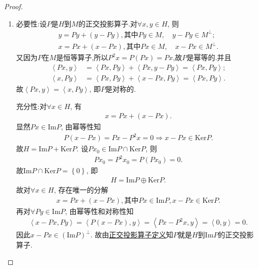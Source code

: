 \documentclass[../../main.tex]{subfiles}%
\begin{document}
\begin{proof}
\begin{enumerate}[(1)]
\item {\heiti 必要性:}设$P$是$H$到$M$的正交投影算子.对$\forall x,y\in H$, 则
\begin{gather*}
y=Py+\left( y-Py \right),\text{其中}Py\in M,\quad y-Py\in M^\perp;
\\
x=Px+\left( x-Px \right),\text{其中}Px\in M,\quad x-Px\in M^\perp.
\end{gather*}
又因为$P$在$M$是恒等算子,所以$P^2 x=P(Px)=Px$,故$P$是幂等的.并且
\begin{align*}
\left\langle Px,y \right\rangle &=\left\langle Px,Py \right\rangle +\left\langle Px,y-Py \right\rangle =\left\langle Px,Py \right\rangle ; \\
\left\langle x,Py \right\rangle &=\left\langle Px,Py \right\rangle +\left\langle x-Px,Py \right\rangle =\left\langle Px,Py \right\rangle .
\end{align*}
故$\left\langle Px,y \right\rangle =\left\langle x,Py \right\rangle$, 即$P$是对称的.

{\heiti 充分性:}对$\forall x\in H$, 有
\begin{align*}
x=Px+\left( x-Px \right).
\end{align*}
显然$Px\in \mathrm{Im}P$, 由幂等性知
\begin{align*}
P\left( x-Px \right) =Px-P^2x=0\Longrightarrow x-Px\in \mathrm{Ker}P.
\end{align*}
故$H=\mathrm{Im}P+\mathrm{Ker}P$. 设$Px_0\in \mathrm{Im}P\cap \mathrm{Ker}P$, 则
\begin{align*}
Px_0=P^2x_0=P\left( Px_0 \right) =0.
\end{align*}
故$\mathrm{Im}P\cap \mathrm{Ker}P=\left\{ 0 \right\}$, 即
\begin{align*}
H=\mathrm{Im}P\oplus \mathrm{Ker}P.
\end{align*}
故对$\forall x\in H$, 存在唯一的分解
\begin{align*}
x=Px+\left( x-Px \right),\text{其中}Px\in \mathrm{Im}P,x-Px\in \mathrm{Ker}P.
\end{align*}
再对$\forall Py\in \mathrm{Im}P$, 由幂等性和对称性知
\begin{align*}
\left\langle x-Px,Py \right\rangle =\left\langle P\left( x-Px \right),y \right\rangle =\left\langle Px-P^2x,y \right\rangle =\left\langle 0,y \right\rangle =0.
\end{align*}
因此$x-Px\in \left( \mathrm{Im}P \right) ^{\perp}$. 故由\hyperref[theorem:正交投影算子定义]{正交投影算子定义}知$P$就是$H$到$\mathrm{Im}P$的正交投影算子.


\end{enumerate}
\end{proof}
\end{document}
